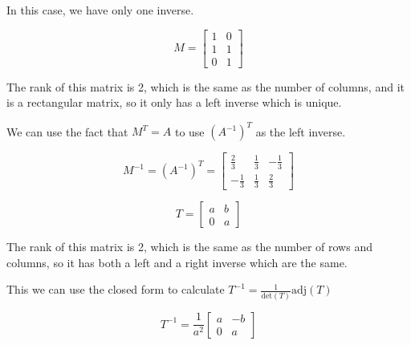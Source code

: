 \documentclass[12pt,letterpaper]{article}
\begin{document}
      In this case, we have only one inverse.

      \[
        M =
        \begin{bmatrix}
          1 & 0 \\
          1 & 1 \\
          0 & 1
        \end{bmatrix}
      \]

      The rank of this matrix is 2, which is the same as the number of columns, and it is a rectangular matrix, so it only has a left inverse which is unique.

      We can use the fact that $M^T = A$ to use $(A^{-1})^T$ as the left inverse.

      \[
        M^{-1} = (A^{-1})^T =
        \begin{bmatrix}
          \frac{2}{3} & \frac{1}{3} & -\frac{1}{3} \\
          -\frac{1}{3} & \frac{1}{3} & \frac{2}{3}
        \end{bmatrix}
      \]

      \[
        T =
        \begin{bmatrix}
          a & b \\
          0 & a
        \end{bmatrix}
      \]

      The rank of this matrix is 2, which is the same as the number of rows and columns, so it has both a left and a right inverse which are the same.

      This we can use the closed form to calculate $T^{-1} = \frac{1}{\text{det}(T)}\text{adj}(T)$

      \[
        T^{-1} =
        \frac{1}{a^2}
        \begin{bmatrix}
          a & -b \\
          0 & a
        \end{bmatrix}
      \]
\end{document}
